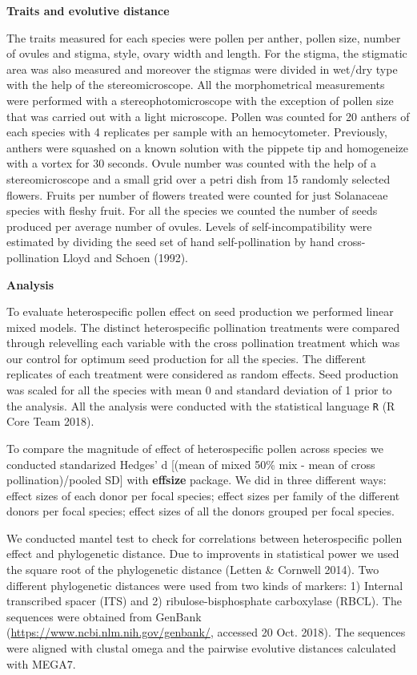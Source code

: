 \documentclass[11pt,a4paper]{article}
\begin{document}
\textbf{Traits and evolutive distance}

The traits measured for each species were pollen per anther, pollen
size, number of ovules and stigma, style, ovary width and length. For
the stigma, the stigmatic area was also measured and moreover the
stigmas were divided in wet/dry type with the help of the
stereomicroscope. All the morphometrical measurements were performed
with a stereophotomicroscope with the exception of pollen size that was
carried out with a light microscope. Pollen was counted for 20 anthers
of each species with 4 replicates per sample with an hemocytometer.
Previously, anthers were squashed on a known solution with the pippete
tip and homogeneize with a vortex for 30 seconds. Ovule number was
counted with the help of a stereomicroscope and a small grid over a
petri dish from 15 randomly selected flowers. Fruits per number of
flowers treated were counted for just Solanaceae species with fleshy
fruit. For all the species we counted the number of seeds produced per
average number of ovules. Levels of self-incompatibility were estimated
by dividing the seed set of hand self-pollination by hand
cross-pollination Lloyd and Schoen (1992).

\textbf{Analysis}

To evaluate heterospecific pollen effect on seed production we performed
linear mixed models. The distinct heterospecific pollination treatments
were compared through relevelling each variable with the cross
pollination treatment which was our control for optimum seed production
for all the species. The different replicates of each treatment were
considered as random effects. Seed production was scaled for all the
species with mean 0 and standard deviation of 1 prior to the analysis.
All the analysis were conducted with the statistical language \texttt{R}
(R Core Team 2018).

To compare the magnitude of effect of heterospecific pollen across
species we conducted standarized Hedges' d {[}(mean of mixed 50\% mix -
mean of cross pollination)/pooled SD{]} with \textbf{effsize} package.
We did in three different ways: effect sizes of each donor per focal
species; effect sizes per family of the different donors per focal
species; effect sizes of all the donors grouped per focal species.

We conducted mantel test to check for correlations between
heterospecific pollen effect and phylogenetic distance. Due to
improvents in statistical power we used the square root of the
phylogenetic distance (Letten \& Cornwell 2014). Two different
phylogenetic distances were used from two kinds of markers: 1) Internal
transcribed spacer (ITS) and 2) ribulose-bisphosphate carboxylase
(RBCL). The sequences were obtained from GenBank
(\url{https://www.ncbi.nlm.nih.gov/genbank/}, accessed 20 Oct. 2018).
The sequences were aligned with clustal omega and the pairwise evolutive
distances calculated with MEGA7.
\end{document}
